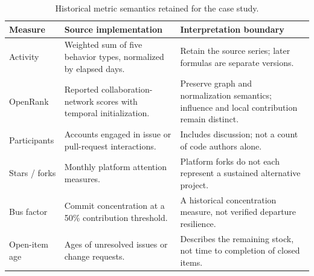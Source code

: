 \begin{table}[tbp]
\caption{Historical metric semantics retained for the case study.}
\label{tab:ch9-metrics}
\centering\small\renewcommand{\arraystretch}{1.13}
\begin{tabularx}{\linewidth}{@{}>{\raggedright\arraybackslash}p{25mm}>{\raggedright\arraybackslash}X>{\raggedright\arraybackslash}X@{}}\toprule
Measure & Source implementation & Interpretation boundary \\\midrule
Activity & Weighted sum of five behavior types, normalized by elapsed days. & Retain the source series; later formulas are separate versions.\\
OpenRank & Reported collaboration-network scores with temporal initialization. & Preserve graph and normalization semantics; influence and local contribution remain distinct.\\
Participants & Accounts engaged in issue or pull-request interactions. & Includes discussion; not a count of code authors alone.\\
Stars / forks & Monthly platform attention measures. & Platform forks do not each represent a sustained alternative project.\\
Bus factor & Commit concentration at a 50\% contribution threshold. & A historical concentration measure, not verified departure resilience.\\
Open-item age & Ages of unresolved issues or change requests. & Describes the remaining stock, not time to completion of closed items.\\\bottomrule
\end{tabularx}
\end{table}
